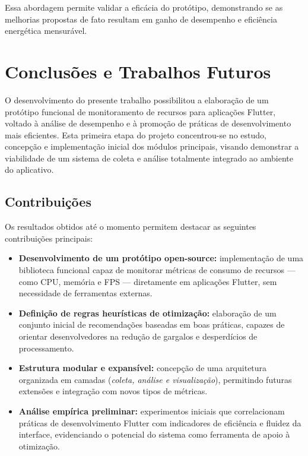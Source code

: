 \documentclass[12pt,a4paper,oneside]{abntex2}
\begin{document}
Essa abordagem permite validar a eficácia do protótipo, demonstrando se as melhorias propostas de fato resultam em ganho de desempenho e eficiência energética mensurável.

\chapter{Conclusões e Trabalhos Futuros}

O desenvolvimento do presente trabalho possibilitou a elaboração de um protótipo funcional de monitoramento de recursos para aplicações Flutter, voltado à análise de desempenho e à promoção de práticas de desenvolvimento mais eficientes.  
Esta primeira etapa do projeto concentrou-se no estudo, concepção e implementação inicial dos módulos principais, visando demonstrar a viabilidade de um sistema de coleta e análise totalmente integrado ao ambiente do aplicativo.

\section{Contribuições}

Os resultados obtidos até o momento permitem destacar as seguintes contribuições principais:

\begin{itemize}
  \item \textbf{Desenvolvimento de um protótipo open-source:} implementação de uma biblioteca funcional capaz de monitorar métricas de consumo de recursos — como CPU, memória e FPS — diretamente em aplicações Flutter, sem necessidade de ferramentas externas.
  
  \item \textbf{Definição de regras heurísticas de otimização:} elaboração de um conjunto inicial de recomendações baseadas em boas práticas, capazes de orientar desenvolvedores na redução de gargalos e desperdícios de processamento.
  
  \item \textbf{Estrutura modular e expansível:} concepção de uma arquitetura organizada em camadas (\textit{coleta, análise e visualização}), permitindo futuras extensões e integração com novos tipos de métricas.
  
  \item \textbf{Análise empírica preliminar:} experimentos iniciais que correlacionam práticas de desenvolvimento Flutter com indicadores de eficiência e fluidez da interface, evidenciando o potencial do sistema como ferramenta de apoio à otimização.
\end{itemize}
\end{document}
